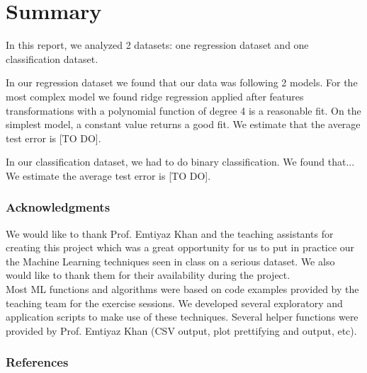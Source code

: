 \documentclass{article} %
\begin{document}
\section{Summary}
In this report, we analyzed 2 datasets: one regression dataset and one classification dataset. 

In our regression dataset we found that our data was following 2 models. For the most complex model we found ridge regression applied after features transformations with a polynomial function of degree 4 is a reasonable fit. On the simplest model, a constant value returns a good fit. We estimate that the average test error is [TO DO].

In our classification dataset, we had to do binary classification. We found that... We estimate the average test error is [TO DO].

\subsubsection*{Acknowledgments}
  We would like to thank Prof. Emtiyaz Khan and the teaching assistants for creating this project which was a great opportunity for us to put in practice our the Machine Learning techniques seen in class on a serious dataset. We also would like to thank them for their availability during the project.\\
  Most ML functions and algorithms were based on code examples provided by the teaching team for the exercise sessions. We developed several exploratory and application scripts to make use of these techniques. Several helper functions were provided by Prof. Emtiyaz Khan (CSV output, plot prettifying and output, etc).
  
\subsubsection*{References}
\end{document}
